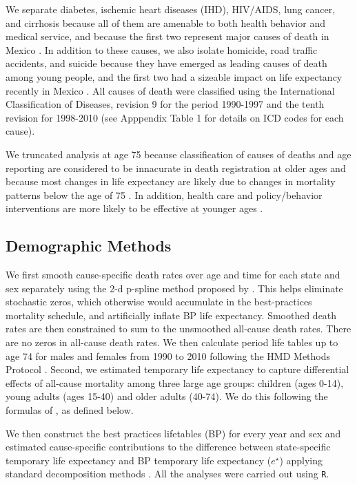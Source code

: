 \documentclass{article}
\begin{document}
We separate diabetes, ischemic heart diseases (IHD), HIV/AIDS, lung
cancer, and cirrhosis because all of them are amenable to both health behavior
and medical service, and because the first two represent major causes of death
in Mexico \citep{canudas2014}. In addition to these causes, we also isolate
homicide, road traffic accidents, and suicide because they have emerged as
leading causes of death among young people, and the first two had a sizeable
impact on life expectancy recently in Mexico \citep{canudas2014}. All causes of death were classified using the International Classification of Diseases, revision 9 for the period 1990-1997 and the tenth revision for 1998-2010 (see Apppendix Table 1 for details on ICD codes for each cause).

We truncated analysis at age 75 because classification of causes of deaths and age reporting are considered to be innacurate in death registration at older ages \citep{tobias2001} and because most changes in life expectancy are likely due to changes in mortality patterns below the age of 75 \citep{Aburto2015}. In addition, health care and policy/behavior interventions are more likely to be effective at younger ages \cite{elo2014}.


\subsection*{Demographic Methods}
We first smooth cause-specific death rates over age and time for each
state and sex separately using the 2-d p-spline method proposed by
\citet{GC2012}.
This helps eliminate stochastic zeros, which otherwise would accumulate in the best-practices mortality
schedule, and artificially inflate BP life expectancy. Smoothed death rates are
then constrained to sum to the unsmoothed all-cause death rates. There are no
zeros in all-cause death rates. We then calculate period life tables up to
age 74 for males and females from 1990 to 2010 following the HMD Methods
Protocol \citep{HMDMP}. Second, we estimated temporary life expectancy to
capture differential effects of all-cause mortality among three large age
groups: children (ages 0-14), young adults (ages 15-40) and older adults
(40-74). We do this following the formulas of \citet{arriaga1984}, as
defined below.

We then construct the best practices lifetables (BP) for every year and sex
and estimated cause-specific contributions to the difference between
state-specific temporary life expectancy and BP temporary life expectancy
($e^{\star}$) applying standard decomposition methods
\citep{horiuchi2008}. All the analyses were carried out
using \texttt{R}.
\end{document}
